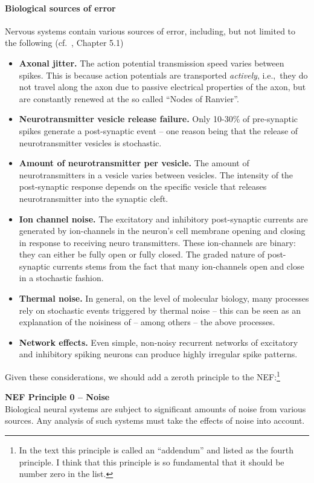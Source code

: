 \documentclass[10pt,letterpaper,oneside]{article}
\begin{document}
\paragraph{Biological sources of error}
Nervous systems contain various sources of error, including, but not limited to the following (cf.~\cite{gerstner2002spiking}, Chapter 5.1)
\begin{itemize}
	\item \textbf{Axonal jitter.}
	The action potential transmission speed varies between spikes. This is because action potentials are transported \emph{actively}, i.e.,~they do not travel along the axon due to passive electrical properties of the axon, but are constantly renewed at the so called \enquote{Nodes of Ranvier}.
	\item \textbf{Neurotransmitter vesicle release failure.}
	Only 10-30\% of pre-synaptic spikes generate a post-synaptic event -- one reason being that the release of neurotransmitter vesicles is stochastic.
	\item \textbf{Amount of neurotransmitter per vesicle.}
	The amount of neurotransmitters in a vesicle varies between vesicles. The intensity of the post-synaptic response depends on the specific vesicle that releases neurotransmitter into the synaptic cleft.
	\item \textbf{Ion channel noise.}
	The excitatory and inhibitory post-synaptic currents are generated by ion-channels in the neuron's cell membrane opening and closing in response to receiving neuro transmitters. These ion-channels are binary: they can either be fully open or fully closed. The graded nature of post-synaptic currents stems from the fact that many ion-channels open and close in a stochastic fashion.
	\item \textbf{Thermal noise.}
	In general, on the level of molecular biology, many processes rely on stochastic events triggered by thermal noise -- this can be seen as an explanation of the noisiness of -- among others -- the above processes.
	\item \textbf{Network effects.}
	Even simple, non-noisy recurrent networks of excitatory and inhibitory spiking neurons can produce highly irregular spike patterns.
\end{itemize}

Given these considerations, we should add a zeroth principle to the NEF:\footnote{In the text this principle is called an \enquote{addendum} and listed as the fourth principle. I think that this principle is so fundamental that it should be number zero in the list.}
\begin{mdframed}
	\textbf{NEF Principle 0 -- Noise}\\
	Biological neural systems are subject to significant amounts of noise from various sources. Any analysis of such systems must take the effects of noise into account.
\end{mdframed}
\end{document}
